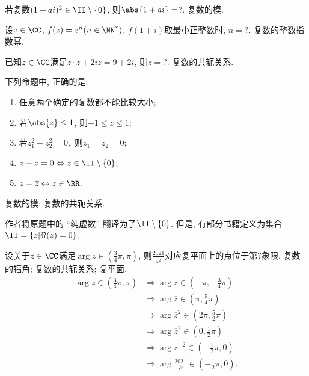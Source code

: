\documentclass[8pt]{article}
\begin{document}
		\begin{easonproblem}
			若复数\((1 + ai)^2 \in \II \setminus \left\{0\right\}\), 则\(\abs{1+ai} = \)?.
			\subproblem
			 复数的模.
		\end{easonproblem}

		\begin{easonproblem}
			设\(z \in \CC\), \(f(z) = z^n (n \in \NN^{*})\), \(f(1+i)\)取最小正整数时, \(n = \)?.
			\subproblem
			 复数的整数指数幂.
		\end{easonproblem}

		\begin{easonproblem}
			已知\(z \in \CC\)满足\(z \cdot \overline{z} + 2 i z = 9 + 2i\), 则\(z = \)?.
			\subproblem
			 复数的共轭关系.
		\end{easonproblem}

		\begin{easonproblem}
			下列命题中, 正确的是:
			\begin{enumerate}[label=\calword{(\arabic*)}]
				\item 任意两个确定的复数都不能比较大小;
    			\item 若\(\abs{z} \leq 1\), 则\(-1 \leq z \leq 1\);
       			\item 若\(z_1^2 + z_2^2 = 0,\) 则\(z_1 = z_2 = 0\);
          		\item \(z + \overline{z} = 0 \Leftrightarrow z \in \II \setminus \left\{0\right\}\);
           		\item \(z = \overline{z} \Leftrightarrow z \in \RR\).
			\end{enumerate}
			\subproblem
			 复数的模; 复数的共轭关系.

			 作者将原题中的 “纯虚数” 翻译为了\(\II \setminus \left\{0\right\}\). 但是, 有部分书籍定义为集合\(\II = \left\{z|\Re(z) = 0\right\}\).\cite{zeroisimg}
		\end{easonproblem}

		\begin{easonbigproblem}
			设关于\(z \in \CC\)满足\(\arg z \in \displaystyle \left(\frac{3}{4} \pi, \pi\right)\), 则\(\displaystyle \frac{2021}{\overline{z^2}}\)对应复平面上的点位于第?象限.
			\subbigproblem
			 复数的辐角; 复数的共轭关系; 复平面.
			\begin{align}
				\arg z \in \left(\frac{3}{4} \pi, \pi\right) &\Rightarrow \arg \overline{z} \in \left(-\pi, -\frac{3}{4} \pi\right)\\
				&\Rightarrow \arg \overline{z} \in \left(\pi, \frac{5}{4} \pi\right)\\
				&\Rightarrow \arg \overline{z}^2 \in \left(2\pi, \frac{5}{2} \pi\right)\\
				&\Rightarrow \arg \overline{z}^2 \in \left(0, \frac{1}{2} \pi\right)\\
				&\Rightarrow \arg \overline{z}^{-2} \in \left(-\frac{1}{2} \pi, 0\right)\\
				&\Rightarrow \arg{\frac{2021}{\overline{z^2}}} \in \left(-\frac{1}{2} \pi, 0\right).
			\end{align}
		\end{easonbigproblem}
\end{document}

